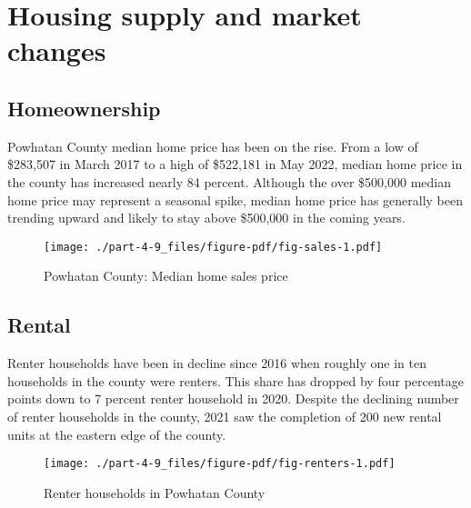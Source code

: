 \documentclass[
  letterpaper,
  DIV=11,
  numbers=noendperiod]{scrreprt}
\begin{document}
\hypertarget{housing-supply-and-market-changes-8}{%
\section{Housing supply and market
changes}\label{housing-supply-and-market-changes-8}}

\hypertarget{homeownership-8}{%
\subsection{Homeownership}\label{homeownership-8}}

Powhatan County median home price has been on the rise. From a low of
\$283,507 in March 2017 to a high of \$522,181 in May 2022, median home
price in the county has increased nearly 84 percent. Although the over
\$500,000 median home price may represent a seasonal spike, median home
price has generally been trending upward and likely to stay above
\$500,000 in the coming years.

\begin{figure}

{\centering \texttt{[image: ./part-4-9\_files/figure-pdf/fig-sales-1.pdf]}

}

\caption{\label{fig-sales}Powhatan County: Median home sales price}

\end{figure}

\hypertarget{rental-8}{%
\subsection{Rental}\label{rental-8}}

Renter households have been in decline since 2016 when roughly one in
ten households in the county were renters. This share has dropped by
four percentage points down to 7 percent renter household in 2020.
Despite the declining number of renter households in the county, 2021
saw the completion of 200 new rental units at the eastern edge of the
county.

\begin{figure}

{\centering \texttt{[image: ./part-4-9\_files/figure-pdf/fig-renters-1.pdf]}

}

\caption{\label{fig-renters}Renter households in Powhatan County}

\end{figure}
\end{document}
